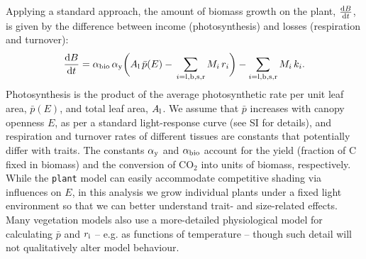 \documentclass[9pt,twocolumn,twoside,lineno]{pnas-new}
\newcommand{\plant}{\texttt{plant}}
\begin{document}
Applying a standard approach, the amount of biomass growth on the plant, $\frac{{\rm d}B}{{\rm d}t}$, is given by the difference between income (photosynthesis) and losses (respiration and turnover)\citep{Makela-1997, Thornley-2000}:
\begin{equation}\label{eq:dbdt}
\frac{{\rm d}B}{{\rm d}t}
= \alpha_{\rm bio} \,
\alpha_{\rm y}
\bigg( A_{\rm l} \, \bar{p}(E) -
\, \sum_{i = {\rm l}, {\rm b}, {\rm s}, {\rm r}}{M_i \, r_i}\bigg)
- \sum_{i = {\rm l}, {\rm b}, {\rm s},  {\rm r}}{M_i \, k_i}.
\end{equation}
Photosynthesis is the product of the average photosynthetic rate per unit leaf area, $\bar{p}(E)$, and total leaf area, $A_{\rm l}$. We assume that $\bar{p}$ increases with canopy openness $E$, as per a standard light-response curve (see SI for details), and respiration and turnover rates of different tissues are constants that potentially differ with traits. The constants $\alpha_{\rm y}$ and $\alpha_{\rm bio}$ account for the yield (fraction of C fixed in biomass) and the conversion of CO$_2$ into units of biomass, respectively. While the {\plant} model can easily accommodate competitive shading via influences on $E$, in this analysis we grow individual plants under a fixed light environment so that we can better understand trait- and size-related effects. Many vegetation models also use a more-detailed physiological model for calculating $\bar{p}$ and $r_{\rm i}$ -- e.g. as functions of temperature -- though such detail will not qualitatively alter model behaviour.
\end{document}

